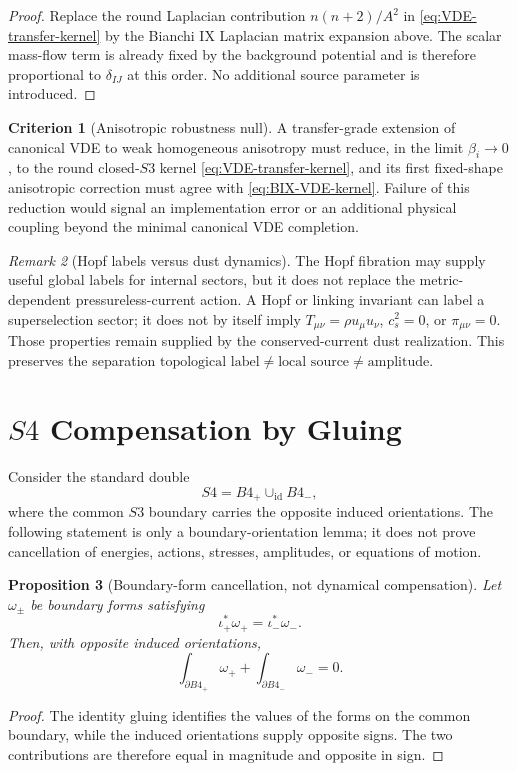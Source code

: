 \documentclass[11pt,a4paper]{article}
\def\Bfour{B4}%
\def\Sthree{S3}%
\def\Sfour{S4}%
\numberwithin{equation}{section}
\theoremstyle{definition}
\newtheorem{criterion}{Criterion}
\theoremstyle{plain}
\newtheorem{proposition}[criterion]{Proposition}
\theoremstyle{remark}
\newtheorem{remark}[criterion]{Remark}
\newcommand{\Sthree}{S^3}
\newcommand{\Sfour}{S^4}
\newcommand{\Bfour}{B^4}
\begin{document}
\begin{proof}
Replace the round Laplacian contribution \(n(n+2)/A^2\) in
\cref{eq:VDE-transfer-kernel} by the Bianchi IX Laplacian matrix expansion above.
The scalar mass-flow term is already fixed by the background potential and is
therefore proportional to \(\delta_{IJ}\) at this order.  No additional source
parameter is introduced.
\end{proof}

\begin{criterion}[Anisotropic robustness null]
A transfer-grade extension of canonical VDE to weak homogeneous anisotropy must
reduce, in the limit \(\beta_i\to0\), to the round closed-\(\Sthree\) kernel
\cref{eq:VDE-transfer-kernel}, and its first fixed-shape anisotropic correction
must agree with \cref{eq:BIX-VDE-kernel}.  Failure of this reduction would signal
an implementation error or an additional physical coupling beyond the minimal
canonical VDE completion.
\end{criterion}

\begin{remark}[Hopf labels versus dust dynamics]
The Hopf fibration may supply useful global labels for internal sectors, but it
does not replace the metric-dependent pressureless-current action.  A Hopf or
linking invariant can label a superselection sector; it does not by itself imply
\(T_{\mu\nu}=\rho u_\mu u_\nu\), \(c_s^2=0\), or
\(\pi_{\mu\nu}=0\).  Those properties remain supplied by the conserved-current
dust realization.  This preserves the separation
\(\text{topological label}\neq\text{local source}\neq\text{amplitude}\).
\end{remark}

\section{\texorpdfstring{$\Sfour$}{S4} Compensation by Gluing}
Consider the standard double
\begin{equation}
\Sfour=\Bfour_+\cup_{\mathrm{id}}\Bfour_-,
\end{equation}
where the common \(\Sthree\) boundary carries the opposite induced orientations. The following statement is only a boundary-orientation lemma; it does not prove cancellation of energies, actions, stresses, amplitudes, or equations of motion.

\begin{proposition}[Boundary-form cancellation, not dynamical compensation]
Let \(\omega_\pm\) be boundary forms satisfying
\begin{equation}
\iota_+^*\omega_+=\iota_-^*\omega_-.
\end{equation}
Then, with opposite induced orientations,
\begin{equation}
\int_{\partial\Bfour_+}\omega_+ + \int_{\partial\Bfour_-}\omega_-=0.
\end{equation}
\end{proposition}
\begin{proof}
The identity gluing identifies the values of the forms on the common boundary, while the induced orientations supply opposite signs. The two contributions are therefore equal in magnitude and opposite in sign.
\end{proof}
\end{document}
